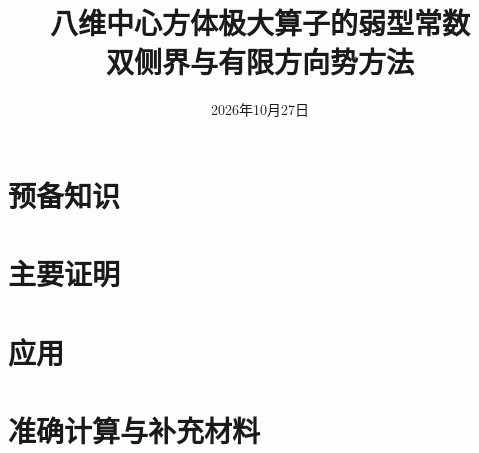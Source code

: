 \documentclass[UTF8,a4paper,11pt,fontset=fandol]{ctexart}
\title{八维中心方体极大算子的弱型常数\\双侧界与有限方向势方法}
\author{}
\date{2026年10月27日}
\theoremstyle{definition}\newtheorem{definition}[theorem]{定义}
\theoremstyle{remark}\newtheorem{remark}[theorem]{注}
\begin{document}
\maketitle

\tableofcontents

\section{预备知识}
\section{主要证明}
\section{应用}
\appendix\section{准确计算与补充材料}

\end{document}
